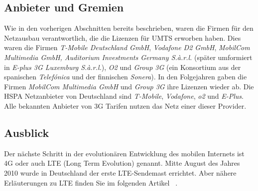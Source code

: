 \begin{multicols}{3}
\subsection*{Anbieter und Gremien}
Wie in den vorherigen Abschnitten bereits beschrieben, waren die Firmen für den Netzausbau verantwortlich, die die Lizenzen für UMTS erworben haben. Dies waren die Firmen \textit{T-Mobile Deutschland GmbH}, \textit{Vodafone D2 GmbH}, \textit{MobilCom Multimedia GmbH, Auditorium Investments Germany S.à.r.l.} (später umformiert in \textit{E-plus 3G Luxemburg S.à.r.l.}), \textit{O2} und \textit{Group 3G} (ein Konsortium aus der spanischen \textit{Telefónica} und der finnischen \textit{Sonera}). In den Folgejahren gaben die Firmen \textit{MobilCom Multimedia GmbH} und \textit{Group 3G} ihre Lizenzen wieder ab.
Die HSPA Netzanbieter von Deutschland sind \textit{T-Mobile}, \textit{Vodafone}, \textit{o2} und \textit{E-Plus}. Alle bekannten Anbieter von 3G Tarifen nutzen das Netz einer dieser Provider. 
~\cite{3G.1, 3G.2}

\subsection*{Ausblick}
Der nächste Schritt in der evolutionären Entwicklung des mobilen Internets ist 4G oder auch LTE (Long Term Evolution) genannt. Mitte August des Jahres 2010 wurde in Deutschland der erste LTE-Sendemast errichtet. Aber nähere Erläuterungen zu LTE finden Sie im folgenden Artikel ~\cite{3G.2}.

\printbibliography[segment=8,heading=subbibliography]
\end{multicols}

\newpage
